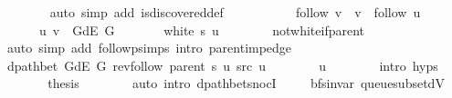 \begin{isabellebody}
\ \ \ \ \ \ \isamarkupfalse%
\ {\isacharparenleft}{\kern0pt}auto\ simp\ add{\isacharcolon}{\kern0pt}\ is{\isacharunderscore}{\kern0pt}discovered{\isacharunderscore}{\kern0pt}def{\isacharparenright}{\kern0pt}\isanewline
\ \ \ \ \isamarkupfalse%
\isanewline
\ \ \ \ \ \ {\isachardoublequoteopen}follow\ v\ {\isacharequal}{\kern0pt}\ v\ {\isacharhash}{\kern0pt}\ follow\ u{\isachardoublequoteclose}\isanewline
\ \ \ \ \ \ {\isachardoublequoteopen}{\isacharparenleft}{\kern0pt}u{\isacharcomma}{\kern0pt}\ v{\isacharparenright}{\kern0pt}\ {\isasymin}\ G{\isachardot}{\kern0pt}dE\ G{\isachardoublequoteclose}\isanewline
\ \ \ \ \ \ {\isachardoublequoteopen}{\isasymnot}\ white\ s\ u{\isachardoublequoteclose}\isanewline
\ \ \ \ \ \ \isamarkupfalse%
\ not{\isacharunderscore}{\kern0pt}white{\isacharunderscore}{\kern0pt}if{\isacharunderscore}{\kern0pt}parent\isanewline
\ \ \ \ \ \ \isamarkupfalse%
\ {\isacharparenleft}{\kern0pt}auto\ simp\ add{\isacharcolon}{\kern0pt}\ follow{\isacharunderscore}{\kern0pt}psimps\ intro{\isacharcolon}{\kern0pt}\ parent{\isacharunderscore}{\kern0pt}imp{\isacharunderscore}{\kern0pt}edge{\isacharparenright}{\kern0pt}\isanewline
\ \ \ \ \isamarkupfalse%
\ \isamarkupfalse%
\ {\isachardoublequoteopen}dpath{\isacharunderscore}{\kern0pt}bet\ {\isacharparenleft}{\kern0pt}G{\isachardot}{\kern0pt}dE\ G{\isacharparenright}{\kern0pt}\ {\isacharparenleft}{\kern0pt}rev{\isacharunderscore}{\kern0pt}follow\ {\isacharparenleft}{\kern0pt}parent\ s{\isacharparenright}{\kern0pt}\ u{\isacharparenright}{\kern0pt}\ src\ u{\isachardoublequoteclose}\isanewline
\ \ \ \ \ \ \isamarkupfalse%
\ u\isanewline
\ \ \ \ \ \ \isamarkupfalse%
\ {\isacharparenleft}{\kern0pt}intro\ {\isachardoublequoteopen}{}{\isachardot}{\kern0pt}hyps{\isachardoublequoteclose}{\isacharparenright}{\kern0pt}\isanewline
\ \ \ \ \isamarkupfalse%
\ \isamarkupfalse%
\ {\isacharquery}{\kern0pt}thesis\isanewline
\ \ \ \ \ \ \isamarkupfalse%
\ {\isacharparenleft}{\kern0pt}auto\ intro{\isacharcolon}{\kern0pt}\ dpath{\isacharunderscore}{\kern0pt}bet{\isacharunderscore}{\kern0pt}snocI{\isacharparenright}{\kern0pt}\isanewline
\ \ \isamarkupfalse%
\isanewline
{}\isamarkupfalse%
%
\endisatagproof
{\isafoldproof}%
%
\isadelimproof
\isanewline
%
\endisadelimproof
%
\isadeliminvisible
\isanewline
%
\endisadeliminvisible
%
\isataginvisible
{}\isamarkupfalse%
\ {\isacharparenleft}{\kern0pt}\ bfs{\isacharunderscore}{\kern0pt}invar{\isacharparenright}{\kern0pt}\ queue{\isacharunderscore}{\kern0pt}subset{\isacharunderscore}{\kern0pt}dV{\isacharcolon}{\kern0pt}\isanewline

\end{isabellebody}
